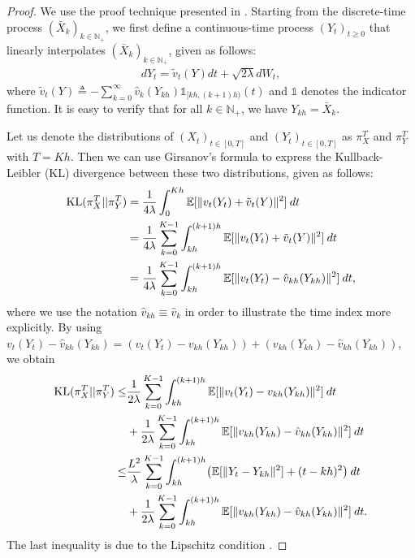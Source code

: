 \begin{proof}
We use the proof technique presented in \cite{dalalyan2017theoretical,raginsky17a}. Starting from the discrete-time process $(\bar{X}_k)_{k\in \mathbb{N}_+}$, we first define a continuous-time process $(Y_t)_{t\geq 0}$ that linearly interpolates $(\bar{X}_k)_{k\in \mathbb{N}_+}$, given as follows: 
\begin{align}
d Y_t = \tilde{v}_t(Y) dt + \sqrt{2 \lambda} dW_t, \label{eqn:sde_linear}
\end{align}
where $\tilde{v}_t(Y) \triangleq - \sum_{k=0}^{\infty} \hat{v}_k (Y_{kh}) \mathds{1}_{[kh, (k+1)h)}(t)$ and $\mathds{1}$ denotes the indicator function. It is easy to verify that for all $k \in \mathbb{N}_+$, we have $Y_{kh} = \bar{X}_k$. 

Let us denote the distributions of $(X_t)_{t \in [0,T]}$ and $(Y_t)_{t \in [0,T]}$ as $\pi_{X}^T$ and $\pi_{Y}^T$ with $T = Kh$. Then we can use Girsanov's formula to express the Kullback-Leibler (KL) divergence between these two distributions, given as follows:
\begin{align}
\textnormal{KL} (\pi_{X}^T || \pi_{Y}^T) &= \frac1{4 \lambda} \int_0^{Kh} \mathbb{E}[ \|v_t(Y_t) + \tilde{v}_t(Y) \|^2 ]  \> dt \\
&= \frac1{4 \lambda} \sum_{k=0}^{K-1} \int_{kh}^{(k+1)h} \mathbb{E}[ \|v_t(Y_t) + \tilde{v}_t(Y) \|^2 ] \> dt \\
&= \frac1{4 \lambda} \sum_{k=0}^{K-1} \int_{kh}^{(k+1)h} \mathbb{E}[ \|v_t(Y_t) - \hat{v}_{kh}(Y_{kh}) \|^2 ] \> dt,
\end{align}
where we use the notation $\hat{v}_{kh} \equiv \hat{v}_{k}$ in order to illustrate the time index more explicitly. By using $v_t(Y_t) - \hat{v}_{kh}(Y_{kh}) = ( v_t(Y_t) - v_{kh}(Y_{kh})) + ( v_{kh}(Y_{kh}) - \hat{v}_{kh}(Y_{kh}))$, we obtain
%
\begin{align}
\nonumber \textnormal{KL} (\pi_{X}^T || \pi_{Y}^T) \leq& \frac1{2 \lambda} \sum_{k=0}^{K-1} \int_{kh}^{(k+1)h} \mathbb{E}[ \|v_t(Y_t) - {v}_{kh}(Y_{kh}) \|^2 ] \> dt \\
&+  \frac1{2 \lambda} \sum_{k=0}^{K-1} \int_{kh}^{(k+1)h} \mathbb{E}[ \|v_{kh}(Y_{kh}) - \hat{v}_{kh}(Y_{kh}) \|^2 ] \> dt \\
\nonumber \leq& \frac{L^2}{\lambda} \sum_{k=0}^{K-1} \int_{kh}^{(k+1)h} \bigl(\mathbb{E}[ \|Y_t - Y_{kh} \|^2 ] + (t-kh)^2 \bigr)  \> dt \\
&+  \frac1{2 \lambda} \sum_{k=0}^{K-1} \int_{kh}^{(k+1)h} \mathbb{E}[ \|v_{kh}(Y_{kh}) - \hat{v}_{kh}(Y_{kh}) \|^2 ] \> dt . \label{eqn:lem1_proof_interm}
\end{align}
The last inequality is due to the Lipschitz condition .


\end{proof}
